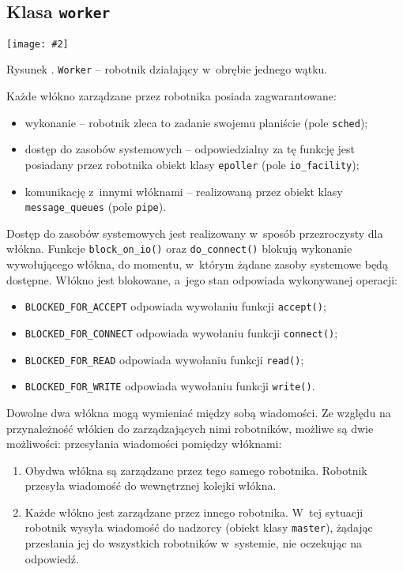 \documentclass[12pt]{mwart}
\newcommand{\code}{\texttt}
\newcommand{\procbr}{()}
\newcommand{\function}[1]{\code{#1\procbr}}
\newcounter{figmain}
\newcommand{\myownfigure}[4]{ \newcounter{#1} \setcounter{#1}{\value{figmain}} \addtocounter{figmain}{1} \begin{center} \label{fig:#1} \centering \texttt{[image: \#2]}\\ \nopagebreak[5] \parbox[t]{11.5cm}{Rysunek \arabic{#1}. #3.} \end{center}}
\begin{document}
\subsection{Klasa \code{worker}}
\myownfigure{Worker}{Worker.png}{\code{Worker} -- robotnik działający w~obrębie jednego wątku}{.7}
\indent
  Każde włókno zarządzane przez robotnika posiada zagwarantowane:
  \begin{itemize}
    \item wykonanie -- robotnik zleca to zadanie swojemu planiście (pole \code{sched});
    \item dostęp do zasobów systemowych -- odpowiedzialny za tę funkcję jest posiadany przez robotnika obiekt klasy \code{epoller} (pole \code{io\_facility});
    \item komunikację z~innymi włóknami -- realizowaną przez obiekt klasy \code{message\_queues} (pole \code{pipe}).
  \end{itemize}
\par
\indent
  Dostęp do zasobów systemowych  jest realizowany w~sposób przezroczysty dla włókna. 
  Funkcje \function{block\_on\_io} oraz \function{do\_connect} blokują wykonanie wywołującego włókna, do momentu, w~którym 
  żądane zasoby systemowe będą dostępne. Włókno jest blokowane, a~jego stan odpowiada wykonywanej operacji:
  \begin{itemize}
    \item \code{BLOCKED\_FOR\_ACCEPT} odpowiada wywołaniu funkcji \function{accept};
    \item \code{BLOCKED\_FOR\_CONNECT} odpowiada wywołaniu funkcji \function{connect};
    \item \code{BLOCKED\_FOR\_READ} odpowiada wywołaniu funkcji \function{read};
    \item \code{BLOCKED\_FOR\_WRITE} odpowiada wywołaniu funkcji \function{write}.
  \end{itemize}
\par
\indent
  Dowolne dwa włókna mogą wymieniać między sobą wiadomości. Ze względu na przynależność włókien do zarządzających nimi robotników, możliwe są dwie możliwości:
  przesyłania wiadomości pomiędzy włóknami:
  \begin{enumerate}
    \item Obydwa włókna są zarządzane przez tego samego robotnika. Robotnik przesyła wiadomość do wewnętrznej kolejki włókna.
    \item Każde włókno jest zarządzane przez innego robotnika. W~tej sytuacji robotnik wysyła wiadomość do nadzorcy (obiekt klasy \code{master}), żądając
      przesłania jej do wszystkich robotników w~systemie, nie oczekując na odpowiedź.
  \end{enumerate}
\end{document}
